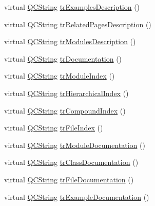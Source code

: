 \begin{DoxyCompactItemize}
\item 
virtual \mbox{\hyperlink{class_q_c_string}{Q\+C\+String}} \mbox{\hyperlink{class_translator_chinesetraditional_ad43b688fcc63d744ab0631338551b334}{tr\+Examples\+Description}} ()
\item 
virtual \mbox{\hyperlink{class_q_c_string}{Q\+C\+String}} \mbox{\hyperlink{class_translator_chinesetraditional_ab2e776ba63d174c19e000c6e50dc585e}{tr\+Related\+Pages\+Description}} ()
\item 
virtual \mbox{\hyperlink{class_q_c_string}{Q\+C\+String}} \mbox{\hyperlink{class_translator_chinesetraditional_a01d9d192e4bc1a127942d94ac0f79f65}{tr\+Modules\+Description}} ()
\item 
virtual \mbox{\hyperlink{class_q_c_string}{Q\+C\+String}} \mbox{\hyperlink{class_translator_chinesetraditional_adb29a4b3089d770c0b1ec8351fad1ed8}{tr\+Documentation}} ()
\item 
virtual \mbox{\hyperlink{class_q_c_string}{Q\+C\+String}} \mbox{\hyperlink{class_translator_chinesetraditional_aeda555d82882d5ba994b3ab492ec8903}{tr\+Module\+Index}} ()
\item 
virtual \mbox{\hyperlink{class_q_c_string}{Q\+C\+String}} \mbox{\hyperlink{class_translator_chinesetraditional_a40a00739f96d6ca0c88bfa677c86e992}{tr\+Hierarchical\+Index}} ()
\item 
virtual \mbox{\hyperlink{class_q_c_string}{Q\+C\+String}} \mbox{\hyperlink{class_translator_chinesetraditional_a7dc1fe9022bd659c8b0e8ed6b659c4ff}{tr\+Compound\+Index}} ()
\item 
virtual \mbox{\hyperlink{class_q_c_string}{Q\+C\+String}} \mbox{\hyperlink{class_translator_chinesetraditional_a6a3cacc21a0a190f46eef8d37a1b5d20}{tr\+File\+Index}} ()
\item 
virtual \mbox{\hyperlink{class_q_c_string}{Q\+C\+String}} \mbox{\hyperlink{class_translator_chinesetraditional_a2fa6ec38cec31f9282b3d697ff02e135}{tr\+Module\+Documentation}} ()
\item 
virtual \mbox{\hyperlink{class_q_c_string}{Q\+C\+String}} \mbox{\hyperlink{class_translator_chinesetraditional_a023c78624554447745aca5c07d76212f}{tr\+Class\+Documentation}} ()
\item 
virtual \mbox{\hyperlink{class_q_c_string}{Q\+C\+String}} \mbox{\hyperlink{class_translator_chinesetraditional_ad7dc1ff0496b4035b4d12ac73df6b38c}{tr\+File\+Documentation}} ()
\item 
virtual \mbox{\hyperlink{class_q_c_string}{Q\+C\+String}} \mbox{\hyperlink{class_translator_chinesetraditional_a9854b2d04ca29b03620b861fa4e68a47}{tr\+Example\+Documentation}} ()

\end{DoxyCompactItemize}
